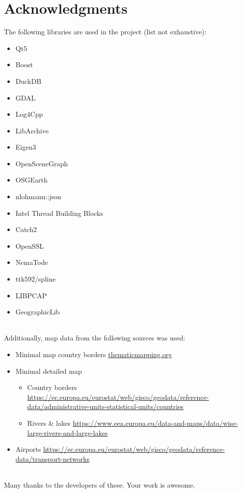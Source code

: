 \section{Acknowledgments}

The following libraries are used in the project (list not exhaustive):

\begin{itemize}  
\item Qt5
\item Boost
\item DuckDB
\item GDAL
\item Log4Cpp
\item LibArchive
\item Eigen3
\item OpenSceneGraph
\item OSGEarth
\item nlohmann::json
\item Intel Thread Building Blocks
\item Catch2
\item OpenSSL
\item NemaTode
\item ttk592/spline
\item LIBPCAP
\item GeographicLib
\end{itemize}
\ \\

Additionally, map data from the following sources was used:
\begin{itemize}  
\item Minimal map country borders \url{thematicmapping.org}
\item Minimal detailed map
\begin{itemize} 
\item Country borders \url{https://ec.europa.eu/eurostat/web/gisco/geodata/reference-data/administrative-units-statistical-units/countries}
\item Rivers \& lakes \url{https://www.eea.europa.eu/data-and-maps/data/wise-large-rivers-and-large-lakes}
\end{itemize}
\item Airports \url{https://ec.europa.eu/eurostat/web/gisco/geodata/reference-data/transport-networks}
\end{itemize}
\ \\

Many thanks to the developers of these. Your work is awesome.

